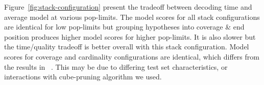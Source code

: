 \documentclass[11pt]{article}
\begin{document}
Figure~\ref{fig:stack-configuration} present the tradeoff between decoding time and average model at various pop-limits. The model scores for all stack configurations are identical for low pop-limits but grouping hypotheses into coverage \& end position produces higher model scores for higher pop-limits. It is also slower but the time/quality tradeoff is better overall with this stack configuration. Model scores for coverage and cardinality configurations are identical, which differs from the results in ~. This may be due to differing test set characteristics, or interactions with cube-pruning algorithm we used.
\end{document}
